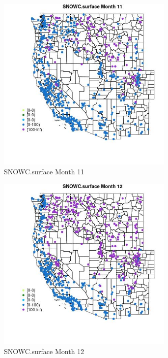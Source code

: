 \begin{figure} 
\centering  
\includegraphics[width=0.77\textwidth]{Code_Outputs/Report_ML_input_PM25_Step4_part_f_de_duplicated_aves_prioritize_24hr_obswNAs_MapObsMo11SNOWCsurface.jpg} 
\caption{\label{fig:Report_ML_input_PM25_Step4_part_f_de_duplicated_aves_prioritize_24hr_obswNAsMapObsMo11SNOWCsurface}SNOWC.surface Month 11} 
\end{figure} 
 

\begin{figure} 
\centering  
\includegraphics[width=0.77\textwidth]{Code_Outputs/Report_ML_input_PM25_Step4_part_f_de_duplicated_aves_prioritize_24hr_obswNAs_MapObsMo12SNOWCsurface.jpg} 
\caption{\label{fig:Report_ML_input_PM25_Step4_part_f_de_duplicated_aves_prioritize_24hr_obswNAsMapObsMo12SNOWCsurface}SNOWC.surface Month 12} 
\end{figure} 
 

